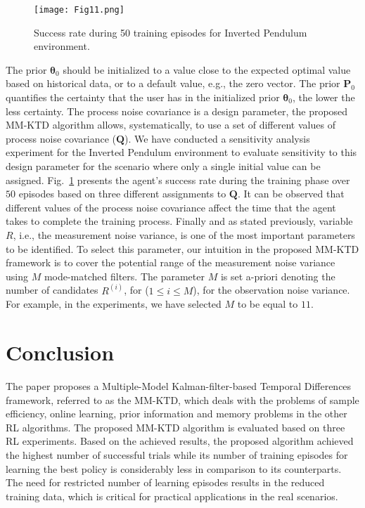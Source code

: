 \documentclass{ieeeaccess}
\def\MMK{\text{MM-KTD}}
\def\i{^{i}}
\def\Q{\bm{Q}}
\def\i{^{(i)}}
\begin{document}
\begin{figure}[t!]
\centering
\texttt{[image: Fig11.png]}
\caption{\small Success rate during 50 training episodes for Inverted Pendulum environment.}\label{Fig:sens}
\end{figure}

The prior $\bm{\theta}_0$ should be initialized to a value close to the expected optimal value based on historical data, or to a default value, e.g., the zero vector. The prior $\bm{P}_0$ quantifies the certainty that the user has in the initialized prior $\bm{\theta}_0$, the lower the less certainty. The process noise covariance is a design parameter, the proposed MM-KTD algorithm allows, systematically, to use a set of different values of process noise covariance ($\Q$).  We have conducted a sensitivity analysis experiment for the Inverted Pendulum environment to evaluate sensitivity to this design parameter for the scenario where only a single initial value can be assigned. Fig.~\ref{Fig:sens} presents the agent's success rate during the training phase over $50$ episodes based on three different assignments to $\Q$. It can be observed that different values of the process noise covariance affect the time that the agent takes to complete the training process. Finally and as stated previously, variable $R$, i.e., the measurement noise variance, is one of the most important parameters to be identified. To select this parameter, our intuition in the proposed MM-KTD framework is to cover the potential range of the measurement noise variance using $M$ mode-matched filters. The parameter $M$ is set a-priori denoting the number of candidates $R\i$, for ($1 \leq i \leq M$), for the observation noise variance. For example, in the experiments, we have selected $M$ to be equal to $11$.
\section{Conclusion}  \label{sec:con}
The paper proposes a Multiple-Model Kalman-filter-based Temporal Differences framework, referred to as the $\MMK$, which deals with the problems of sample efficiency, online learning, prior information and memory problems in the other RL algorithms. The proposed $\MMK$ algorithm is evaluated based on three RL experiments. Based on the achieved results, the proposed algorithm achieved the highest number of successful trials while its number of training episodes for learning the best policy is considerably less in comparison to its counterparts. The need for restricted number of learning episodes results in the reduced training data, which is critical for practical applications in the real scenarios.
\end{document}
